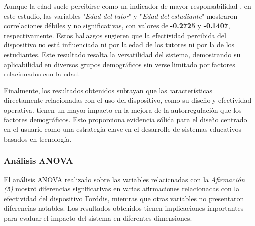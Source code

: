Aunque la edad suele percibirse como un indicador de mayor responsabilidad \citep{Moss2018Why}, en este estudio, las variables "\textit{Edad del tutor}" y "\textit{Edad del estudiante}" mostraron correlaciones débiles y no significativas, con valores de \textbf{-0.2725} y \textbf{-0.1407}, respectivamente. Estos hallazgos sugieren que la efectividad percibida del dispositivo no está influenciada ni por la edad de los tutores ni por la de los estudiantes. Este resultado resalta la versatilidad del sistema, demostrando su aplicabilidad en diversos grupos demográficos sin verse limitado por factores relacionados con la edad.

Finalmente, los resultados obtenidos subrayan que las características directamente relacionadas con el uso del dispositivo, como su diseño y efectividad operativa, tienen un mayor impacto en la mejora de la autorregulación que los factores demográficos. Esto proporciona evidencia sólida para el diseño centrado en el usuario como una estrategia clave en el desarrollo de sistemas educativos basados en tecnología.

\subsubsection{Análisis ANOVA}
El análisis ANOVA realizado sobre las variables relacionadas con la \textit{Afirmación (5)} mostró diferencias significativas en varias afirmaciones relacionadas con la efectividad del dispositivo Torddis, mientras que otras variables no presentaron diferencias notables. Los resultados obtenidos tienen implicaciones importantes para evaluar el impacto del sistema en diferentes dimensiones.

